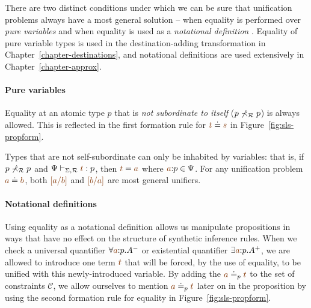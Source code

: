 There are two distinct conditions under which we can be sure that
unification problems always have a most general solution -- when
equality is performed over {\it pure variables} and when equality is
used as a {\it notational definition}
\cite{pfenning99algorithms}. Equality of pure variable types is
used in the destination-adding transformation in
Chapter~\ref{chapter-destinations}, and notational definitions are
used extensively in Chapter~\ref{chapter-approx}.

\paragraph{Pure variables} Equality at an atomic type $p$ that is {\it
  not subordinate to itself} ($p \not\prec_\mathcal R p$) is always
allowed.  This is reflected in the first formation rule for $\lf{t}
\doteq \lf{s}$ in Figure~\ref{fig:sls-propform}.

Types that are not self-subordinate can only be inhabited by
variables: that is, if $p \not\prec_\mathcal R p$ and $\Psi
\vdash_{\Sigma,\subord} \lf{t} : p$, then $\lf{t} = \lf{{a}}$ where
$\lf{a}{:}p \in \Psi$. For any unification problem $\lf{{a}} \doteq
\lf{{b}}$, both $\lf{[{a}/b]}$ and $\lf{[{b}/a]}$ are most general
unifiers.


\paragraph{Notational definitions} Using equality as a notational
definition allows us manipulate propositions in ways that have no
effect on the structure of synthetic inference rules. When we check a
universal quantifier $\forall \lf{a}{:}p. A^-$ or existential
quantifier $\exists \lf{a}{:}p.A^+$, we are allowed to introduce one
term $\lf{t}$ that will be forced, by the use of equality, to be
unified with this newly-introduced variable. 
%
By adding the $\lf{a} \doteq_p \lf{t}$ to the set of constraints
$\mathcal C$, we allow ourselves to mention $\lf{a} \doteq_p \lf{t}$
later on in the proposition by using the second formation rule for equality
in Figure~\ref{fig:sls-propform}.

